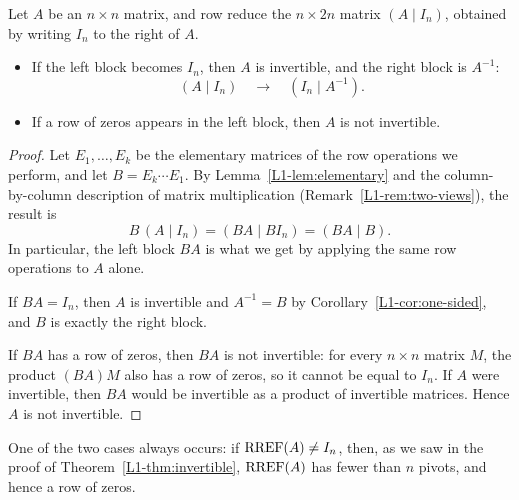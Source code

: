 \begin{theorem}\label{L1-thm:gauss-jordan}
    Let $A$ be an $n \times n$ matrix, and row reduce the $n \times 2n$ matrix $(A \mid I_n)$, obtained by writing $I_n$ to the right of $A$.
    \begin{itemize}
        \item If the left block becomes $I_n$, then $A$ is invertible, and the right block is $A^{-1}$:
        \[(A \mid I_n) \quad \longrightarrow \quad (I_n \mid A^{-1}).\]
        \item If a row of zeros appears in the left block, then $A$ is not invertible.
    \end{itemize}
\end{theorem}

\begin{proof}
    Let $E_1, \ldots, E_k$ be the elementary matrices of the row operations we perform, and let $B = E_k \cdots E_1$. By Lemma~\ref{L1-lem:elementary} and the column-by-column description of matrix multiplication (Remark~\ref{L1-rem:two-views}), the result is
    \[B\,(A \mid I_n) = (BA \mid B I_n) = (BA \mid B).\]
    In particular, the left block $BA$ is what we get by applying the same row operations to $A$ alone.

    If $BA = I_n$, then $A$ is invertible and $A^{-1} = B$ by Corollary~\ref{L1-cor:one-sided}, and $B$ is exactly the right block.

    If $BA$ has a row of zeros, then $BA$ is not invertible: for every $n \times n$ matrix $M$, the product $(BA)M$ also has a row of zeros, so it cannot be equal to $I_n$. If $A$ were invertible, then $BA$ would be invertible as a product of invertible matrices. Hence $A$ is not invertible.
\end{proof}

One of the two cases always occurs: if $\operatorname{RREF}(A) \neq I_n$, then, as we saw in the proof of Theorem~\ref{L1-thm:invertible}, $\operatorname{RREF}(A)$ has fewer than $n$ pivots, and hence a row of zeros.

